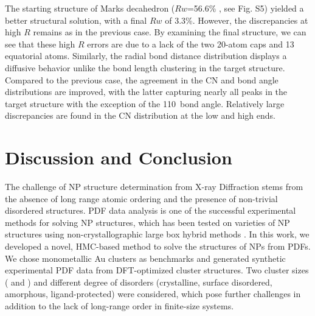 The starting structure of Marks decahedron ($Rw$=56.6\% , see Fig. S5) yielded a better structural solution, with a final $Rw$ of 3.3\%.
However, the discrepancies at high $R$ remains as in the previous case. By examining the final structure, we can see that these high $R$ errors are due to a lack of the two 20-atom caps and 13 equatorial atoms. Similarly, the radial bond distance distribution displays a diffusive behavior unlike the bond length clustering in the target structure.
Compared to the previous case, the agreement in the CN and bond angle distributions are improved, with the latter  capturing nearly all peaks in the target structure with the exception of the 110\degree ~bond angle.
Relatively large discrepancies are found in the CN distribution at the low and high ends.

\section{Discussion and Conclusion}
The challenge of NP structure determination from X-ray Diffraction stems from the absence of long range atomic ordering and the presence of non-trivial disordered structures.
PDF data analysis is one of the successful experimental methods for solving NP structures, which has been tested on varieties of NP structures using non-crystallographic large box hybrid methods \cite{Petkov2014}.
In this work, we developed  a novel, HMC-based  method to solve the structures of NPs from PDFs. We chose monometallic Au clusters as benchmarks and generated synthetic experimental PDF data from DFT-optimized cluster structures. Two cluster sizes ( and ) and different degree of disorders (crystalline, surface disordered,  amorphous, ligand-protected)  were considered, which pose further challenges in addition to the lack of long-range order in finite-size systems.

